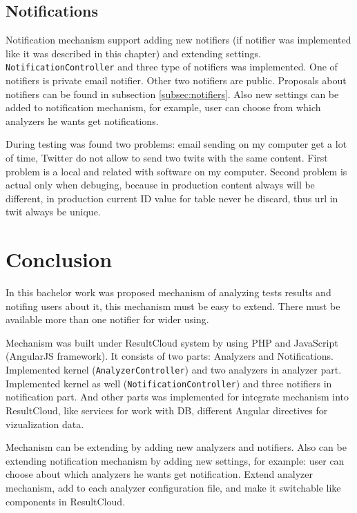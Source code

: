\section{Notifications}

Notification mechanism support adding new notifiers (if notifier was implemented like it was described in this chapter) and extending settings. \texttt{NotificationController} and three type of notifiers was implemented. One of notifiers is private email notifier. Other two notifiers are public. Proposals about notifiers can be found in subsection \ref{subsec:notifiers}. Also new settings can be added to notification mechanism, for example, user can choose from which analyzers he wants get notifications.

During testing was found two problems: email sending on my computer get a lot of time, Twitter do not allow to send two twits with the same content. First problem is a local and related with software on my computer. Second problem is actual only when debuging, because in production content always will be different, in production current ID value for table never be discard, thus url in twit always be unique. 


\chapter{Conclusion}
\label{ch:conclusion}

In this bachelor work was proposed mechanism of analyzing tests results and notifing users about it, this mechanism must be easy to extend. There must be available more than one notifier for wider using.

Mechanism was built under ResultCloud system by using PHP and JavaScript (AngularJS framework). It consists of two parts: Analyzers and Notifications. Implemented kernel (\texttt{AnalyzerController}) and two analyzers in analyzer part. Implemented kernel as well (\texttt{NotificationController}) and three notifiers in notification part. And other parts was implemented for integrate mechanism into ResultCloud, like services for work with DB, different Angular directives for vizualization data.

Mechanism can be extending by adding new analyzers and notifiers. Also can be extending notification mechanism by adding new settings, for example: user can choose about which analyzers he wants get notification. Extend analyzer mechanism, add to each analyzer configuration file, and make it switchable like components in ResultCloud.

